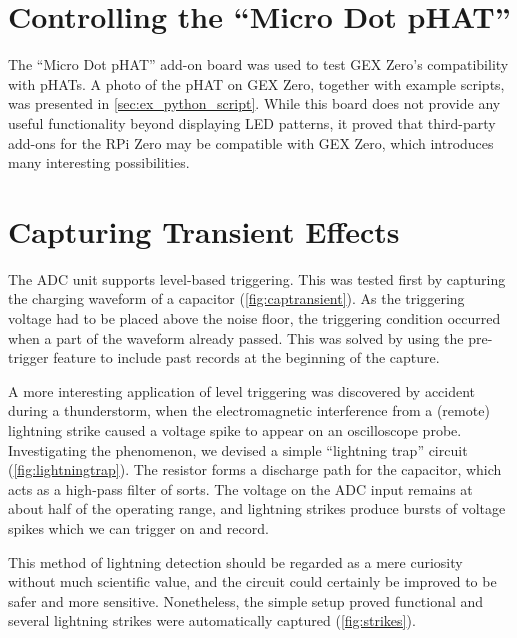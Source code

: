 \section{Controlling the ``Micro Dot pHAT''}

The ``Micro Dot pHAT'' add-on board was used to test GEX Zero's compatibility with pHATs. A photo of the pHAT on GEX Zero, together with example scripts, was presented in \cref{sec:ex_python_script}. While this board does not provide any useful functionality beyond displaying \gls{LED} patterns, it proved that third-party add-ons for the RPi Zero may be compatible with GEX Zero, which introduces many interesting possibilities.

\section{Capturing Transient Effects}

The \gls{ADC} unit supports level-based triggering. This was tested first by capturing the charging waveform of a capacitor (\cref{fig:captransient}). As the triggering voltage had to be placed above the noise floor, the triggering condition occurred when a part of the waveform already passed. This was solved by using the pre-trigger feature to include past records at the beginning of the capture.

A more interesting application of level triggering was discovered by accident during a thunderstorm, when the electromagnetic interference from a (remote) lightning strike caused a voltage spike to appear on an oscilloscope probe. Investigating the phenomenon, we devised a simple ``lightning trap'' circuit (\cref{fig:lightningtrap}). The resistor forms a discharge path for the capacitor, which acts as a high-pass filter of sorts. The voltage on the \gls{ADC} input remains at about half of the operating range, and lightning strikes produce bursts of voltage spikes which we can trigger on and record.

This method of lightning detection should be regarded as a mere curiosity without much scientific value, and the circuit could certainly be improved to be safer and more sensitive. Nonetheless, the simple setup proved functional and several lightning strikes were automatically captured (\cref{fig:strikes}). 

